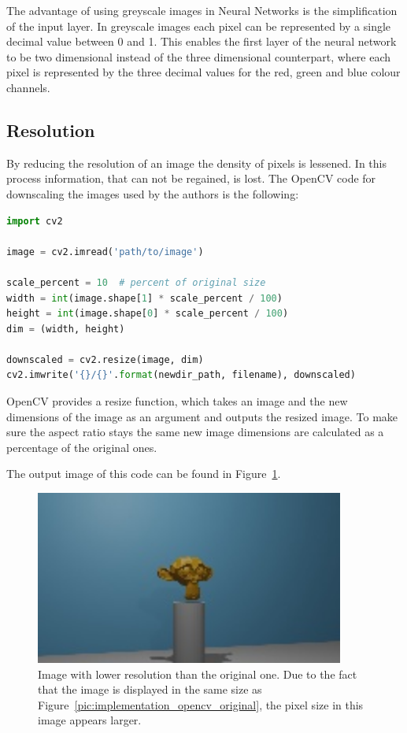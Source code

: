The advantage of using greyscale images in Neural Networks is the simplification of the input layer. In greyscale images each pixel can be represented by a single decimal value between 0 and 1. This enables the first layer of the neural network to be two dimensional instead of the three dimensional counterpart, where each pixel is represented by the three decimal values for the red, green and blue colour channels.

\subsection{Resolution}
By reducing the resolution of an image the density of pixels is lessened. In this process information, that can not be regained, is lost. The OpenCV code for downscaling the images used by the authors is the following:

\begin{lstlisting}[language=python]
import cv2

image = cv2.imread('path/to/image')

scale_percent = 10  # percent of original size
width = int(image.shape[1] * scale_percent / 100)
height = int(image.shape[0] * scale_percent / 100)
dim = (width, height)

downscaled = cv2.resize(image, dim)
cv2.imwrite('{}/{}'.format(newdir_path, filename), downscaled)
\end{lstlisting}

OpenCV provides a resize function, which takes an image and the new dimensions of the image as an argument and outputs the resized image. To make sure the aspect ratio stays the same new image dimensions are calculated as a percentage of the original ones.

The output image of this code can be found in Figure~\ref{pic:implementation_opencv_resolution}.

\begin{figure}[h!]
	\centering
	\includegraphics[width=4in]{img/implementation_opencv_resolution.jpg}
	\caption{Image with lower resolution than the original one. Due to the fact that the image is displayed in the same size as Figure~\ref{pic:implementation_opencv_original}, the pixel size in this image appears larger.}
	\label{pic:implementation_opencv_resolution}
\end{figure}

